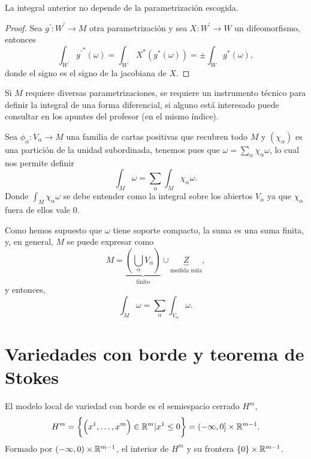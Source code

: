 \begin{lema}
    La integral anterior no depende de la parametrización escogida.
\end{lema}

\begin{proof}
    Sea $g^\prime \colon W^\prime \to M$ otra parametrización y sea $X \colon W^\prime \to W$ un difeomorfismo, entonces
    \[
        \int_{W^\prime} {g^\prime}^\ast(\omega) = \int_{W^\prime} X^\ast\left( g^\ast(\omega) \right) = \pm \int_W g^\ast(\omega),
    \]
    donde el signo es el signo de la jacobiana de $X$.
\end{proof}

\begin{obs}
    Si $M$ requiere diversas parametrizaciones, se requiere un instrumento t\'ecnico para definir la integral de una forma diferencial,
    si alguno está interesado puede consultar en los apuntes del profesor (en el mismo índice).
\end{obs}

\begin{defi}
    Sea $\phi_\alpha \colon V_\alpha \to M$ una familia de cartas positivas que recubren todo $M$ y $\left( \chi_\alpha \right)$ es una
    partición de la unidad subordinada, tenemos pues que $\omega = \sum\limits_\alpha \chi_\alpha \omega$, lo cual nos permite definir
    \[
        \int_M \omega = \sum_\alpha \int_M \chi_\alpha \omega.
    \]
    Donde $\int_M \chi_\alpha \omega$ se debe entender como la integral sobre los abiertos $V_\alpha$ ya que $\chi_\alpha$ fuera de ellos vale
    0.
\end{defi}

\begin{obs}
    Como hemos supuesto que $\omega$ tiene soporte compacto, la suma es una suma finita, y, en general, $M$ se puede expresar como
    \[
        M = \underbrace{\left( \bigcup_\alpha V_\alpha \right)}_{\text{finito}} \cup \underbrace{Z}_{\text{medida nula}},
    \]
    y entonces,
    \[
        \int_M \omega = \sum_\alpha \int_{V_\alpha} \omega.
    \]
\end{obs}

\section{Variedades con borde y teorema de Stokes}\label{section:5-8}

\begin{obs}
    El modelo local de variedad con borde es el semiespacio cerrado $H^m$,
    \[
        H^m = \left\{\left( x^1, \dots, x^m \right) \in \mathbb{R}^m \vert x^1 \leq 0\right\} = (-\infty, 0] \times \mathbb{R}^{m-1}.
    \]
    Formado por $(-\infty, 0) \times \mathbb{R}^{m-1}$, el interior de $H^m$ y su frontera $\{0\} \times \mathbb{R}^{m-1}$.
\end{obs}

